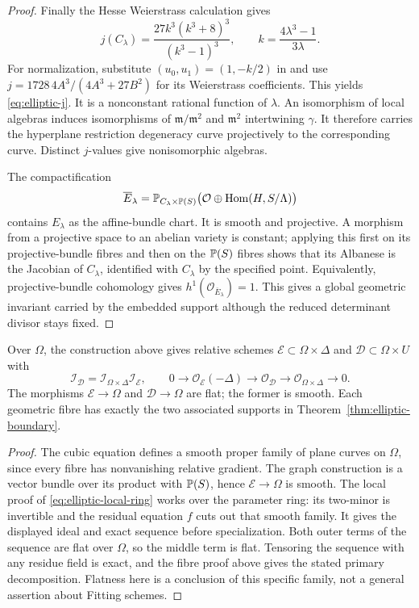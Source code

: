 \begin{proof}
Finally the Hesse Weierstrass calculation gives
\begin{equation}\label{eq:elliptic-j}
 j(C_\lambda)
      =\frac{27k^3(k^3+8)^3}{(k^3-1)^3},
 \qquad k=\frac{4\lambda^3-1}{3\lambda}.
\end{equation}
For normalization, substitute $(u_0,u_1)=(1,-k/2)$ in
\cite[Section 2, equations (4)--(5)]{AD09} and use
$j=1728\,4A^3/(4A^3+27B^2)$ for its Weierstrass coefficients.
This yields \eqref{eq:elliptic-j}. It is a nonconstant rational
function of $\lambda$. An isomorphism of local algebras induces
isomorphisms of $\mathfrak m/\mathfrak m^2$ and $\mathfrak m^2$
intertwining $\gamma$. It therefore carries the hyperplane
restriction degeneracy curve projectively to the corresponding
curve. Distinct $j$-values give nonisomorphic algebras.

The compactification
\[
 \overline E_\lambda=
 \mathbb P_{C_\lambda\times\mathbb P(S)}
       \bigl(\mathcal O\oplus\operatorname{Hom}(H,S/\Lambda)\bigr)
\]
contains $E_\lambda$ as the affine-bundle chart. It is smooth
and projective. A morphism from a projective space to an abelian
variety is constant; applying this first on its projective-bundle
fibres and then on the $\mathbb P(S)$ fibres shows that its Albanese
is the Jacobian of $C_\lambda$, identified with $C_\lambda$ by
the specified point. Equivalently, projective-bundle cohomology
gives $h^1(\mathcal O_{\overline E_\lambda})=1$.
This gives a global geometric invariant carried by the embedded
support although the reduced determinant divisor stays fixed.
\end{proof}

\begin{corollary}
\label{cor:elliptic-family}
Over $\Omega$, the construction above gives relative schemes
$\mathcal E\subset\Omega\times\Delta$ and
$\mathcal D\subset\Omega\times U$ with
\[
 \mathcal I_{\mathcal D}
   =\mathcal I_{\Omega\times\Delta}\mathcal I_{\mathcal E},
 \qquad
 0\to\mathcal O_{\mathcal E}(-\Delta)
   \to\mathcal O_{\mathcal D}
   \to\mathcal O_{\Omega\times\Delta}\to0.
\]
The morphisms $\mathcal E\to\Omega$ and $\mathcal D\to\Omega$
are flat; the former is smooth. Each geometric fibre has exactly
the two associated supports in Theorem~\ref{thm:elliptic-boundary}.
\end{corollary}
\begin{proof}
The cubic equation defines a smooth proper family of plane curves
on $\Omega$, since every fibre has nonvanishing relative gradient.
The graph construction is a vector bundle over its product with
$\mathbb P(S)$, hence $\mathcal E\to\Omega$ is smooth. The local proof
of \eqref{eq:elliptic-local-ring} works over the parameter ring:
its two-minor is invertible and the residual equation $f$ cuts out
that smooth family. It gives the displayed ideal and exact sequence
before specialization. Both outer terms of the sequence are flat
over $\Omega$, so the middle term is flat. Tensoring the sequence
with any residue field is exact, and the fibre proof above gives
the stated primary decomposition. Flatness here is a conclusion of
this specific family, not a general assertion about Fitting schemes.
\end{proof}
